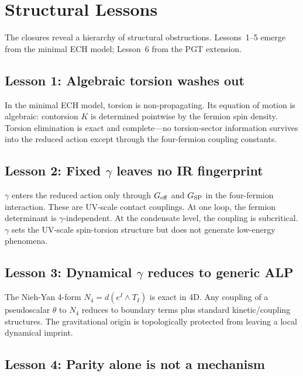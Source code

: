 \documentclass[aps,prd,twocolumn,superscriptaddress,showpacs,preprintnumbers,
  nofootinbib,longbibliography,floatfix]{revtex4-2}
\newcommand{\BI}{\gamma}
\newcommand{\Geff}{G_{\rm eff}}
\newcommand{\Gsp}{G_{\rm SP}}
\begin{document}
\section{Structural Lessons}\label{sec:lessons}

The closures reveal a hierarchy of structural obstructions. Lessons~1--5
emerge from the minimal ECH model; Lesson~6 from the PGT extension.

\subsection{Lesson 1: Algebraic torsion washes out}

In the minimal ECH model, torsion is non-propagating. Its equation of
motion is algebraic: contorsion $K$ is determined pointwise by the fermion
spin density. Torsion elimination is exact and complete---no torsion-sector
information survives into the reduced action except through the
four-fermion coupling constants.

\subsection{Lesson 2: Fixed $\BI$ leaves no IR fingerprint}

$\BI$ enters the reduced action only through $\Geff$ and $\Gsp$ in the
four-fermion interaction. These are UV-scale contact couplings. At one
loop, the fermion determinant is $\BI$-independent. At the condensate
level, the coupling is subcritical. $\BI$ sets the UV-scale spin-torsion
structure but does not generate low-energy phenomena.

\subsection{Lesson 3: Dynamical $\BI$ reduces to generic ALP}

The Nieh-Yan 4-form $N_4 = d(e^I \wedge T_I)$ is exact in 4D. Any
coupling of a pseudoscalar $\theta$ to $N_4$ reduces to boundary terms
plus standard kinetic/coupling structures. The gravitational origin is
topologically protected from leaving a local dynamical imprint.

\subsection{Lesson 4: Parity alone is not a mechanism}
\end{document}
